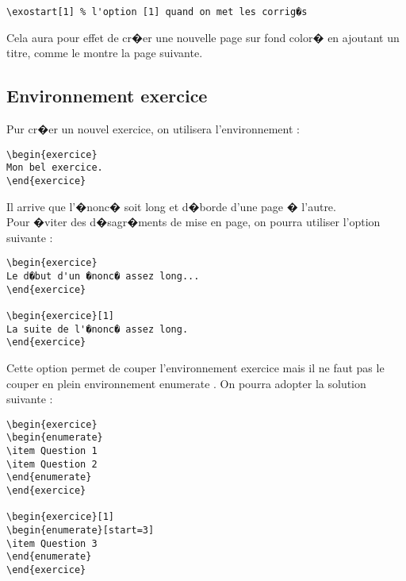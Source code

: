 \documentclass[ams,openany,10pt,presentation,latin1]{mathbook}
\begin{document}
\medskip

\begin{lstlisting}
\exostart[1] % l'option [1] quand on met les corrig�s
\end{lstlisting}

\medskip

Cela aura pour effet de cr�er une nouvelle page sur fond color� en ajoutant un titre, comme le montre la page suivante.


\subsection{Environnement \og exercice \fg}

Pur cr�er un nouvel exercice, on utilisera l'environnement :

\medskip

\begin{lstlisting}
\begin{exercice}
Mon bel exercice.
\end{exercice}
\end{lstlisting}

\medskip

Il arrive que l'�nonc� soit long et d�borde d'une page � l'autre.\\
Pour �viter des d�sagr�ments de mise en page, on pourra utiliser l'option suivante :

\medskip

\begin{lstlisting}
\begin{exercice}
Le d�but d'un �nonc� assez long...
\end{exercice}

\begin{exercice}[1]
La suite de l'�nonc� assez long.
\end{exercice}
\end{lstlisting}

\medskip

Cette option permet de \og couper \fg{} l'environnement \og exercice \fg{} mais il ne faut pas le couper en plein environnement \og enumerate \fg. On pourra adopter la solution suivante :

\medskip

\begin{lstlisting}
\begin{exercice}
\begin{enumerate}
\item Question 1
\item Question 2
\end{enumerate}
\end{exercice}

\begin{exercice}[1]
\begin{enumerate}[start=3]
\item Question 3
\end{enumerate}
\end{exercice}
\end{lstlisting}
\end{document}
